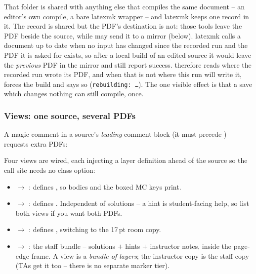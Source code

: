 That folder is shared with anything else that compiles the same document -- an editor's own compile, a bare latexmk wrapper -- and latexmk keeps one record in it.
The record is shared but the PDF's destination is not: those tools leave the PDF beside the source, while  may send it to a mirror (below).
latexmk calls a document up to date when no input has changed since the recorded run and the PDF it is asked for exists, so after a local build of an edited source it would leave the \emph{previous} PDF in the mirror and still report success.
 therefore reads where the recorded run wrote its PDF, and when that is not where this run will write it, forces the build and says so (\texttt{rebuilding: \dots}).
The one visible effect is that a save which changes nothing can still compile, once.

\subsubsection{Views: one source, several PDFs}

A magic comment in a source's \emph{leading} comment block (it must precede
) requests extra PDFs:


Four views are wired, each injecting a layer definition ahead of the source
so the call site needs no class option:

\begin{itemize}
  \item {} $\to$ : defines
    , so  bodies and the boxed MC keys
    print.
  \item {} $\to$ : defines .
    Independent of solutions -- a hint is student-facing help, so list both
    views if you want both PDFs.
  \item {} $\to$ : defines
    , switching  to the 17\,pt room
    copy.
  \item {} $\to$ : the staff
    bundle -- solutions $+$ hints $+$ instructor notes, inside the
    page-edge frame. A view is a \emph{bundle of layers}; the instructor
    copy is the staff copy (TAs get it too -- there is no separate marker
    tier).
\end{itemize}

